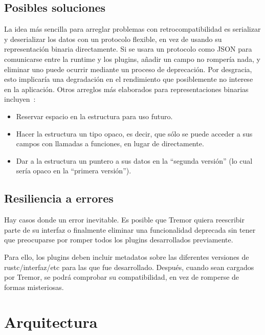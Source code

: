 \subsection{Posibles soluciones}

La idea más sencilla para arreglar problemas con retrocompatibilidad es
serializar y deserializar los datos con un protocolo flexible, en vez de usando
su representación binaria directamente. Si se usara un protocolo como JSON para
comunicarse entre la runtime y los plugins, añadir un campo no rompería nada, y
eliminar uno puede ocurrir mediante un proceso de deprecación. Por desgracia,
esto implicaría una degradación en el rendimiento que posiblemente no interese
en la aplicación. Otros arreglos más elaborados para representaciones binarias
incluyen~\cite{swiftabi}:

\begin{itemize}
    \item Reservar espacio en la estructura para uso futuro.

    \item Hacer la estructura un tipo opaco, es decir, que sólo se puede acceder
        a sus campos con llamadas a funciones, en lugar de directamente.

    \item Dar a la estructura un puntero a sus datos en la ``segunda versión''
        (lo cual sería opaco en la ``primera versión'').

\end{itemize}

\subsection{Resiliencia a errores}

Hay casos donde un error inevitable. Es posible que Tremor quiera reescribir
parte de su interfaz o finalmente eliminar una funcionalidad deprecada sin tener
que preocuparse por romper todos los plugins desarrollados previamente.

Para ello, los plugins deben incluir metadatos sobre las diferentes versiones
de rustc/interfaz/etc para las que fue desarrollado. Después, cuando sean
cargados por Tremor, se podrá comprobar su compatibilidad, en vez de romperse de
formas misteriosas.

\section{Arquitectura}

